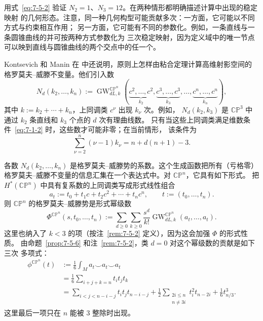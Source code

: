 \begin{exercise}\label{ex:7-5-12}
用式~\eqref{eq:7-5-2} 验证 $N_2=1$、$N_3=12$。在两种情形都明确描述计算中出现的稳定映射
的几何形态。注意，同一种几何构型可能贡献多次：一方面，它可能以不同方式与约束相互作用；
另一方面，它可能有不同的参数化。例如，一条直线与一条圆锥曲线的并可按两种方式参数化为
三次稳定映射，因为定义域中的唯一节点可以映到直线与圆锥曲线的两个交点中的任一个。
\end{exercise}

Kontsevich 和 Manin 在  中还说明，原则上怎样由粘合定理计算高维射影空间的
格罗莫夫--威滕不变量。他们引入数
\[
  N_d(k_2,\ldots,k_n)
  :=\operatorname{GW}_{dL,k}^{\mathbb{CP}^n}
  (\underbrace{c^2,\ldots,c^2}_{k_2},
   \underbrace{c^3,\ldots,c^3}_{k_3},\ldots,
   \underbrace{c^n,\ldots,c^n}_{k_n}),
\]
其中 $k:=k_2+\cdots+k_n$，上同调类 $c^\nu$ 出现 $k_\nu$ 次。例如，
$N_d(k_2,k_3)$ 是 $\mathbb{CP}^3$ 中通过 $k_2$ 条直线和 $k_3$ 个点的 $d$ 次有理曲线数。
只有当这些上同调类满足维数条件~\eqref{eq:7-1-2} 时，这些数才可能非零；在当前情形，
该条件为
\begin{equation}\label{eq:7-5-4}
  \sum_{\nu=2}^n(\nu-1)k_\nu=n+d(n+1)-3.
\end{equation}

各数 $N_d(k_2,\ldots,k_n)$ 是格罗莫夫--威滕势的系数。这个生成函数把所有（亏格零）
格罗莫夫--威滕不变量的信息汇集在一个表达式中。对 $\mathbb{CP}^n$，它具有如下形式。
把 $H^*(\mathbb{CP}^n)$ 中具有复系数的上同调类写成形式线性组合
\[
  a_t:=t_0+t_1c+t_2c^2+\cdots+t_nc^n,
  \qquad t:=(t_0,\ldots,t_n).
\]
则 $\mathbb{CP}^n$ 的格罗莫夫--威滕势是形式幂级数
\begin{equation}\label{eq:7-5-5}
  \Phi^{\mathbb{CP}^n}(s,t_0,\ldots,t_n)
  :=\sum_{d\ge0}\sum_{k\ge0}\frac{s^d}{k!}
    \operatorname{GW}_{dL,k}^{\mathbb{CP}^n}(a_t,\ldots,a_t).
\end{equation}
这里也纳入了 $k<3$ 的项（按注~\ref{rem:7-5-2} 定义），因为这会加强 $\Phi$ 的形式性质。
由命题~\ref{prop:7-5-6} 和注~\ref{rem:7-5-2}，类 $d=0$ 对这个幂级数的贡献是如下三次
多项式：
\begin{align*}
  \phi^{\mathbb{CP}^n}(t)
  &:=\frac16\int_Ma_t\smile a_t\smile a_t\\
  &=\frac16\sum_{i+j+k=n}t_it_jt_k\\
  &=\sum_{i<j<n-i-j}t_it_jt_{n-i-j}
    +\frac12\sum_{\substack{2i\le n\\n\ne3i}}t_i^2t_{n-2i}
    +\frac16t_{n/3}^3.
\end{align*}
这里最后一项只在 $n$ 能被 $3$ 整除时出现。


